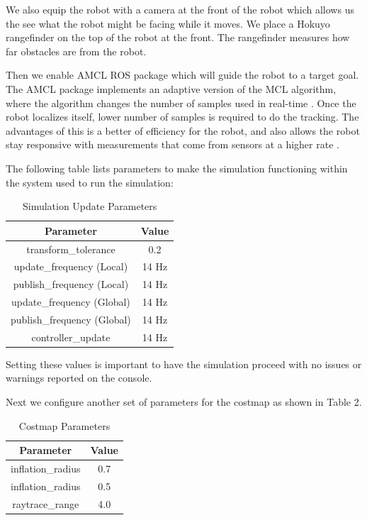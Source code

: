 \documentclass[10pt,journal,compsoc]{IEEEtran}
\begin{document}
We also equip the robot with a camera at the front of the robot which allows us the see what the robot might be facing while it moves. We place a Hokuyo rangefinder on the top of the robot at the front. The rangefinder measures how far obstacles are from the robot.

Then we enable AMCL ROS package which will guide the robot to a target goal. The AMCL package implements an adaptive version of the MCL algorithm, where the algorithm changes the number of samples used in real-time \cite{what-is-amcl}. Once the robot localizes itself, lower number of samples is required to do the tracking. The advantages of this is a better of efficiency for the robot, and also allows the robot stay responsive with measurements that come from sensors at a higher rate \cite{Fox99montecarlo}.

The following table lists parameters to make the simulation functioning within the system used to run the simulation:

\begin{table}[h]
\caption{Simulation Update Parameters}
\label{table_example}
\begin{center}
\begin{tabular}{|c||c|}
\hline
Parameter & Value\\
\hline
transform\_tolerance & 0.2 \\
\hline
update\_frequency (Local) & 14 Hz \\
\hline
publish\_frequency (Local) & 14 Hz\\
\hline
update\_frequency (Global) & 14 Hz \\
\hline
publish\_frequency (Global) & 14 Hz \\
\hline
controller\_update & 14 Hz \\
\hline
\end{tabular}
\end{center}
\end{table}

Setting these values is important to have the simulation proceed with no issues or warnings reported on the console.

Next we configure another set of parameters for the costmap as shown in Table 2.
\begin{table}[h]
\caption{Costmap Parameters}
\label{table_example}
\begin{center}
\begin{tabular}{|c||c|}
\hline
Parameter & Value\\
\hline
inflation\_radius & 0.7 \\
\hline
inflation\_radius & 0.5 \\
\hline
raytrace\_range & 4.0 \\
\hline
\end{tabular}
\end{center}
\end{table}
\end{document}

